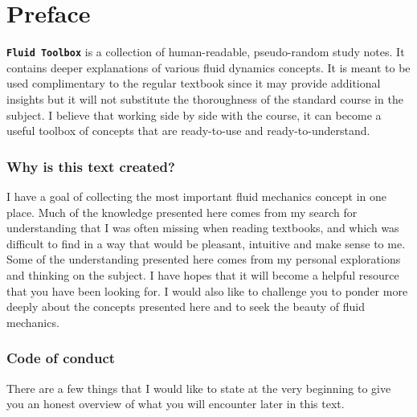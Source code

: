 \documentclass[12pt]{report}
\begin{document}
\setlength{\parskip}{0.6em}
\setlength{\parindent}{0cm}

\tableofcontents
\chapter*{Preface}
\thispagestyle{empty}



\texttt{\textbf{Fluid Toolbox}} is a collection of human-readable, pseudo-random study notes. It contains deeper explanations of various fluid dynamics concepts. It is meant to be used complimentary to the regular textbook since it may provide additional insights but it will not substitute the thoroughness of the standard course in the subject. I believe that working side by side with the course, it can become a useful toolbox of concepts that are ready-to-use and ready-to-understand.

\subsection*{Why is this text created?}

I have a goal of collecting the most important fluid mechanics concept in one place. Much of the knowledge presented here comes from my search for understanding that I was often missing when reading textbooks, and which was difficult to find in a way that would be pleasant, intuitive and make sense to me. Some of the understanding presented here comes from my personal explorations and thinking on the subject. I have hopes that it will become a helpful resource that you have been looking for. I would also like to challenge you to ponder more deeply about the concepts presented here and to seek the beauty of fluid mechanics.

\subsection*{Code of conduct}
\thispagestyle{empty}
There are a few things that I would like to state at the very beginning to give you an honest overview of what you will encounter later in this text.
\end{document}
